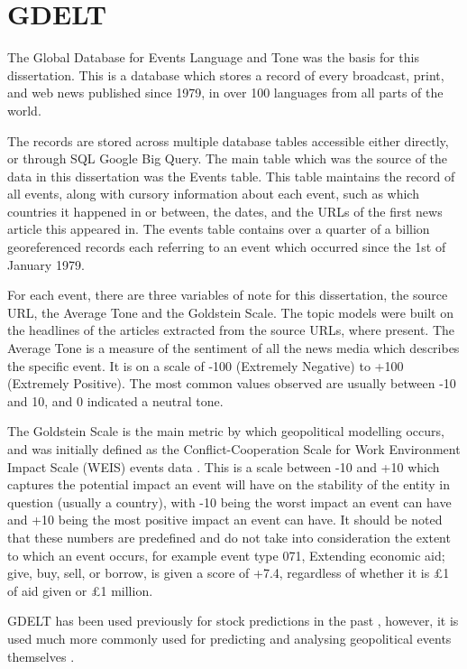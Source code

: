 \section{GDELT}
\label{gdelt}

The Global Database for Events Language and Tone was the basis for this dissertation. This is a database which stores a record of every broadcast, print, and web news published since 1979, in over 100 languages from all parts of the world. 

The records are stored across multiple database tables accessible either directly, or through SQL Google Big Query. The main table which was the source of the data in this dissertation was the Events table. This table maintains the record of all events, along with cursory information about each event, such as which countries it happened in or between, the dates, and the URLs of the first news article this appeared in. The events table contains over a quarter of a billion georeferenced records each referring to an event which occurred since the 1st of January 1979. 

For each event, there are three variables of note for this dissertation, the source URL, the Average Tone and the Goldstein Scale. The topic models were built on the headlines of the articles extracted from the source URLs, where present. The Average Tone is a measure of the sentiment of all the news media which describes the specific event. It is on a scale of -100 (Extremely Negative) to +100 (Extremely Positive). The most common values observed are usually between -10 and 10, and 0 indicated a neutral tone. 

The Goldstein Scale is the main metric by which geopolitical modelling occurs, and was initially defined as the Conflict-Cooperation Scale for Work Environment Impact Scale (WEIS) events data \cite{goldstein1992conflict}. This is a scale between -10 and +10 which captures the potential impact an event will have on the stability of the entity in question (usually a country), with -10 being the worst impact an event can have and +10 being the most positive impact an event can have. It should be noted that these numbers are predefined and do not take into consideration the extent to which an event occurs, for example event type 071, Extending economic aid; give, buy, sell, or borrow, is given a score of +7.4, regardless of whether it is £1 of aid given or £1 million. 

GDELT has been used previously for stock predictions in the past \cite{memari2017predicting} \cite{alamro2019predicting}, however, it is used much more commonly used for predicting and analysing geopolitical events themselves \cite{qiao2017predicting} \cite{yonamine2013predicting}. 